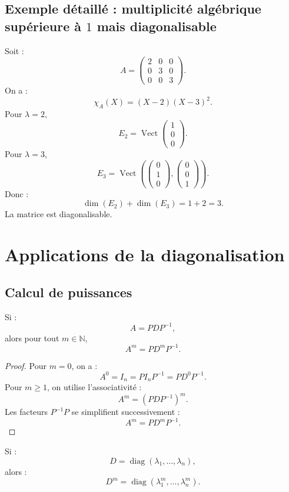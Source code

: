 \documentclass[11pt,a4paper]{article}
\newcommand{\N}{\mathbb N}
\newcommand{\Vect}{\operatorname{Vect}}
\newcommand{\diag}{\operatorname{diag}}
\begin{document}
\subsection{Exemple détaillé : multiplicité algébrique supérieure à \(1\) mais diagonalisable}

Soit :
\[
A=
\begin{pmatrix}
2&0&0\\
0&3&0\\
0&0&3
\end{pmatrix}.
\]
On a :
\[
\chi_A(X)=(X-2)(X-3)^2.
\]
Pour \(\lambda=2\),
\[
E_2=\Vect
\begin{pmatrix}
1\\0\\0
\end{pmatrix}.
\]
Pour \(\lambda=3\),
\[
E_3=\Vect
\left(
\begin{pmatrix}
0\\1\\0
\end{pmatrix},
\begin{pmatrix}
0\\0\\1
\end{pmatrix}
\right).
\]
Donc :
\[
\dim(E_2)+\dim(E_3)=1+2=3.
\]
La matrice est diagonalisable.

\section{Applications de la diagonalisation}

\subsection{Calcul de puissances}

\begin{theorembox}
Si :
\[
A=PDP^{-1},
\]
alors pour tout \(m\in\N\),
\[
A^m=PD^mP^{-1}.
\]
\end{theorembox}

\begin{proof}
Pour \(m=0\), on a :
\[
A^0=I_n=P I_n P^{-1}=PD^0P^{-1}.
\]
Pour \(m\geq1\), on utilise l'associativité :
\[
A^m=(PDP^{-1})^m.
\]
Les facteurs \(P^{-1}P\) se simplifient successivement :
\[
A^m=PD^mP^{-1}.
\]
\end{proof}

\begin{theorembox}
Si :
\[
D=\diag(\lambda_1,\dots,\lambda_n),
\]
alors :
\[
D^m=\diag(\lambda_1^m,\dots,\lambda_n^m).
\]
\end{theorembox}
\end{document}
